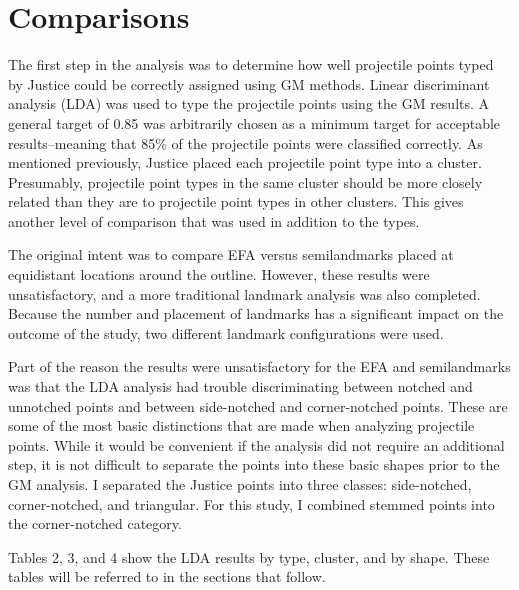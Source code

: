 \documentclass{article}
\begin{document}
\hypertarget{comparisons}{%
\section{Comparisons}\label{comparisons}}

The first step in the analysis was to determine how well projectile
points typed by Justice could be correctly assigned using GM methods.
Linear discriminant analysis (LDA) was used to type the projectile
points using the GM results. A general target of 0.85 was arbitrarily
chosen as a minimum target for acceptable results--meaning that 85\% of
the projectile points were classified correctly. As mentioned
previously, Justice placed each projectile point type into a cluster.
Presumably, projectile point types in the same cluster should be more
closely related than they are to projectile point types in other
clusters. This gives another level of comparison that was used in
addition to the types.

The original intent was to compare EFA versus semilandmarks placed at
equidistant locations around the outline. However, these results were
unsatisfactory, and a more traditional landmark analysis was also
completed. Because the number and placement of landmarks has a
significant impact on the outcome of the study, two different landmark
configurations were used.

Part of the reason the results were unsatisfactory for the EFA and
semilandmarks was that the LDA analysis had trouble discriminating
between notched and unnotched points and between side-notched and
corner-notched points. These are some of the most basic distinctions
that are made when analyzing projectile points. While it would be
convenient if the analysis did not require an additional step, it is not
difficult to separate the points into these basic shapes prior to the GM
analysis. I separated the Justice points into three classes:
side-notched, corner-notched, and triangular. For this study, I combined
stemmed points into the corner-notched category.

Tables 2, 3, and 4 show the LDA results by type, cluster, and by shape.
These tables will be referred to in the sections that follow.

 
  \providecommand{\huxb}[2]{\arrayrulecolor[RGB]{#1}\global\arrayrulewidth=#2pt}
  \providecommand{\huxvb}[2]{\color[RGB]{#1}\vrule width #2pt}
  \providecommand{\huxtpad}[1]{\rule{0pt}{#1}}
  \providecommand{\huxbpad}[1]{\rule[-#1]{0pt}{#1}}
\end{document}
